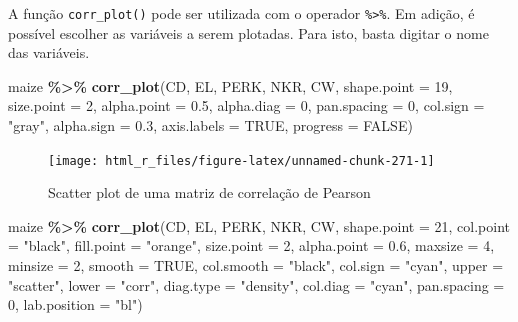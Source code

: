 \documentclass[
]{book}
\newenvironment{Shaded}{\begin{snugshade}}{\end{snugshade}}
\newcommand{\DataTypeTok}[1]{\textcolor[rgb]{0.13,0.29,0.53}{#1}}
\newcommand{\DecValTok}[1]{\textcolor[rgb]{0.00,0.00,0.81}{#1}}
\newcommand{\FloatTok}[1]{\textcolor[rgb]{0.00,0.00,0.81}{#1}}
\newcommand{\KeywordTok}[1]{\textcolor[rgb]{0.13,0.29,0.53}{\textbf{#1}}}
\newcommand{\NormalTok}[1]{#1}
\newcommand{\OperatorTok}[1]{\textcolor[rgb]{0.81,0.36,0.00}{\textbf{#1}}}
\newcommand{\OtherTok}[1]{\textcolor[rgb]{0.56,0.35,0.01}{#1}}
\newcommand{\StringTok}[1]{\textcolor[rgb]{0.31,0.60,0.02}{#1}}
\numberwithin{equation}{section}
\begin{document}
A função \texttt{corr\_plot()} pode ser utilizada com o operador \texttt{\%\textgreater{}\%}. Em adição, é possível escolher as variáveis a serem plotadas. Para isto, basta digitar o nome das variáveis.

\begin{Shaded}
\begin{Highlighting}[]
\NormalTok{maize }\OperatorTok{\%\textgreater{}\%}
\StringTok{  }\KeywordTok{corr\_plot}\NormalTok{(CD, EL, PERK, NKR, CW,}
            \DataTypeTok{shape.point =} \DecValTok{19}\NormalTok{,}
            \DataTypeTok{size.point =} \DecValTok{2}\NormalTok{,}
            \DataTypeTok{alpha.point =} \FloatTok{0.5}\NormalTok{,}
            \DataTypeTok{alpha.diag =} \DecValTok{0}\NormalTok{,}
            \DataTypeTok{pan.spacing =} \DecValTok{0}\NormalTok{,}
            \DataTypeTok{col.sign =} \StringTok{"gray"}\NormalTok{,}
            \DataTypeTok{alpha.sign =} \FloatTok{0.3}\NormalTok{,}
            \DataTypeTok{axis.labels =} \OtherTok{TRUE}\NormalTok{,}
            \DataTypeTok{progress =} \OtherTok{FALSE}\NormalTok{)}
\end{Highlighting}
\end{Shaded}

\begin{figure}

{\centering \texttt{[image: html\_r\_files/figure-latex/unnamed-chunk-271-1]} 

}

\caption{Scatter plot de uma matriz de correlação de Pearson}\label{fig:unnamed-chunk-271}
\end{figure}

\begin{Shaded}
\begin{Highlighting}[]

\NormalTok{maize }\OperatorTok{\%\textgreater{}\%}
\StringTok{  }\KeywordTok{corr\_plot}\NormalTok{(CD, EL, PERK, NKR, CW,}
            \DataTypeTok{shape.point =} \DecValTok{21}\NormalTok{,}
            \DataTypeTok{col.point =} \StringTok{"black"}\NormalTok{,}
            \DataTypeTok{fill.point =} \StringTok{"orange"}\NormalTok{,}
            \DataTypeTok{size.point =} \DecValTok{2}\NormalTok{,}
            \DataTypeTok{alpha.point =} \FloatTok{0.6}\NormalTok{,}
            \DataTypeTok{maxsize =} \DecValTok{4}\NormalTok{,}
            \DataTypeTok{minsize =} \DecValTok{2}\NormalTok{,}
            \DataTypeTok{smooth =} \OtherTok{TRUE}\NormalTok{,}
            \DataTypeTok{col.smooth =} \StringTok{"black"}\NormalTok{,}
            \DataTypeTok{col.sign =} \StringTok{"cyan"}\NormalTok{,}
            \DataTypeTok{upper =} \StringTok{"scatter"}\NormalTok{,}
            \DataTypeTok{lower =} \StringTok{"corr"}\NormalTok{,}
            \DataTypeTok{diag.type =} \StringTok{"density"}\NormalTok{,}
            \DataTypeTok{col.diag =} \StringTok{"cyan"}\NormalTok{,}
            \DataTypeTok{pan.spacing =} \DecValTok{0}\NormalTok{,}
            \DataTypeTok{lab.position =} \StringTok{"bl"}\NormalTok{)}
\end{Highlighting}
\end{Shaded}
\end{document}
